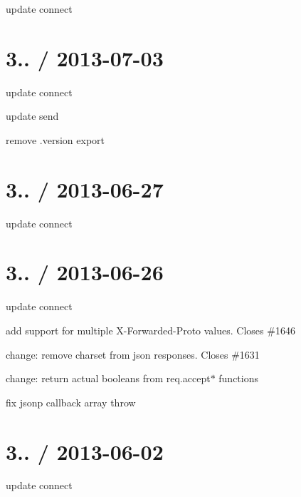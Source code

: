 \begin{DoxyItemize}
\item update connect
\end{DoxyItemize}

\section*{3.. / 2013-\/07-\/03 }


\begin{DoxyItemize}
\item update connect
\item update send
\item remove .version export
\end{DoxyItemize}

\section*{3.. / 2013-\/06-\/27 }


\begin{DoxyItemize}
\item update connect
\end{DoxyItemize}

\section*{3.. / 2013-\/06-\/26 }


\begin{DoxyItemize}
\item update connect
\item add support for multiple X-\/\+Forwarded-\/\+Proto values. Closes \#1646
\item change\+: remove charset from json responses. Closes \#1631
\item change\+: return actual booleans from req.\+accept$\ast$ functions
\item fix jsonp callback array throw
\end{DoxyItemize}

\section*{3.. / 2013-\/06-\/02 }


\begin{DoxyItemize}
\item update connect
\end{DoxyItemize}

